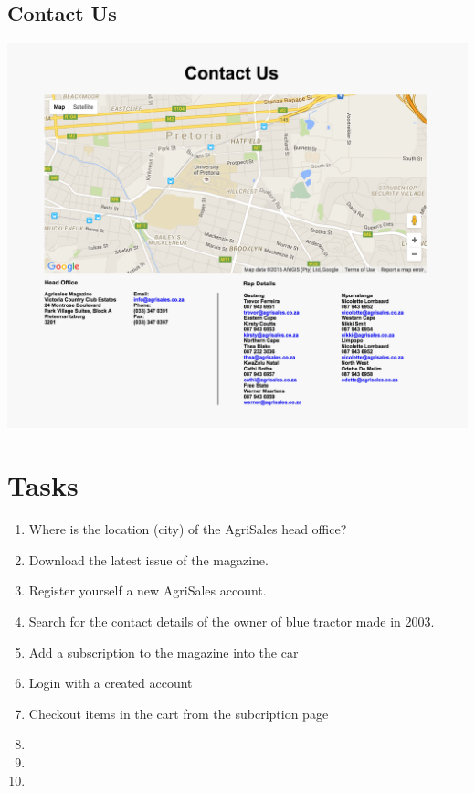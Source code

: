 \documentclass[11pt]{article}
\begin{document}
	\subsection{Contact Us}
		\includegraphics[width=\textwidth]{../Images/ContactUs}

\newpage

\section{Tasks}
	\begin{enumerate}
		\item Where is the location (city) of the AgriSales head office?
		\item Download the latest issue of the magazine.
		\item Register yourself a new AgriSales account.
		\item Search for the contact details of the owner of blue tractor made in 2003.
		\item Add a subscription to the magazine into the car
		\item Login with a created account
		\item Checkout items in the cart from the subcription page
		\item 
		\item 
		\item 
	\end{enumerate}
\end{document}
